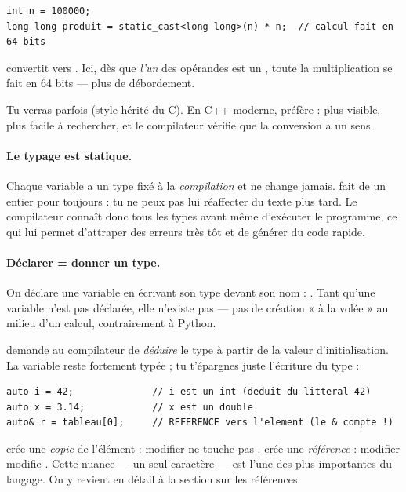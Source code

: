 \documentclass[11pt]{article}
\begin{document}
\begin{lstlisting}
int n = 100000;
long long produit = static_cast<long long>(n) * n;  // calcul fait en 64 bits
\end{lstlisting}

 convertit  vers
. Ici, dès que \emph{l'un} des opérandes est un ,
toute la multiplication se fait en 64 bits — plus de débordement.

\begin{aretenir}
Tu verras parfois  (style hérité du C). En C++ moderne,
préfère  : plus visible, plus facile à
rechercher, et le compilateur vérifie que la conversion a un sens.
\end{aretenir}

\paragraph{Le typage est statique.} Chaque variable a un type fixé à la
\emph{compilation} et ne change jamais.  fait de  un
entier pour toujours : tu ne peux pas lui réaffecter du texte plus tard. Le
compilateur connaît donc tous les types avant même d'exécuter le programme,
ce qui lui permet d'attraper des erreurs très tôt et de générer du code rapide.

\paragraph{Déclarer = donner un type.} On déclare une variable en écrivant son
type devant son nom : . Tant qu'une variable n'est
pas déclarée, elle n'existe pas — pas de création « à la volée » au milieu d'un
calcul, contrairement à Python.

 demande au compilateur de \emph{déduire} le type à partir de la
valeur d'initialisation. La variable reste fortement typée ; tu t'épargnes
juste l'écriture du type :

\begin{lstlisting}
auto i = 42;              // i est un int (deduit du litteral 42)
auto x = 3.14;            // x est un double
auto& r = tableau[0];     // REFERENCE vers l'element (le & compte !)
\end{lstlisting}

\begin{piege}
 crée une \emph{copie} de l'élément : modifier  ne
touche pas .  crée une \emph{référence} : modifier
 modifie . Cette nuance — un seul caractère — est l'une des
plus importantes du langage. On y revient en détail à la section sur les
références.
\end{piege}
\end{document}
